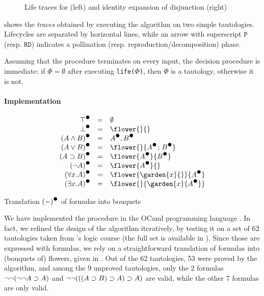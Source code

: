 \begin{scope}
\begin{figure*}
  
  \caption{Life traces for  (left) and identity expansion of
  disjunction (right)}
\end{figure*}

 shows the \emph{traces} obtained by executing the algorithm
on two simple tautologies. Lifecycles are separated by horizontal lines, while
an arrow with superscript $\mathtt{P}$ (resp. $\mathtt{RD}$) indicates a
pollination (resp. reproduction/decomposition) phase.

Assuming that the  procedure terminates on every input, the
decision procedure is immediate: if $\Phi = \emptyset$ after executing
\texttt{life($\Phi$)}, then $\Phi$ is a tautology, otherwise it is not.

\paragraph{Implementation}

\begin{marginfigure}
  $$
  \begin{array}{r@{\quad=\quad}l}
    \dtrans{\top} & \emptyset \\
    \dtrans{\bot} & \flower{}{} \\
    \dtrans{(A \land B)} & \dtrans{A}, \dtrans{B} \\
    \dtrans{(A \lor B)} & \flower{}{\dtrans{A} \sep \dtrans{B}} \\
    \dtrans{(A \limp B)} & \flower{\dtrans{A}}{\dtrans{B}} \\
    \dtrans{(\neg A)} & \flower{\dtrans{A}}{} \\
    \dtrans{(\forall x. A)} & \flower{\garden{x}{{}}}{\dtrans{A}} \\
    \dtrans{(\exists x. A)} & \flower{}{\garden{x}{\dtrans{A}}}
  \end{array}
  $$
  \caption{Translation $\dtrans{(-)}$ of formulas into bouquets}
\end{marginfigure}

We have implemented the  procedure in the OCaml programming
language \cite{flower-auto}. In fact, we refined the design of the algorithm
iteratively, by testing it on a set of 62 tautologies taken from 's logic
course \cite{edukera} (the full set is available in
). Since those are expressed with  formulas,
we rely on a straightforward translation of formulas into (bouquets of) flowers,
given in . Out of the 62 tautologies, 53 were proved by
the algorithm, and among the 9 unproved tautologies, only the 2 formulas
$\neg\neg(\neg\neg A \supset A)$ and $\neg\neg(((A \supset B) \supset A) \supset A)$ are
 valid, while the other 7 formulas are only  valid.


\end{scope}

